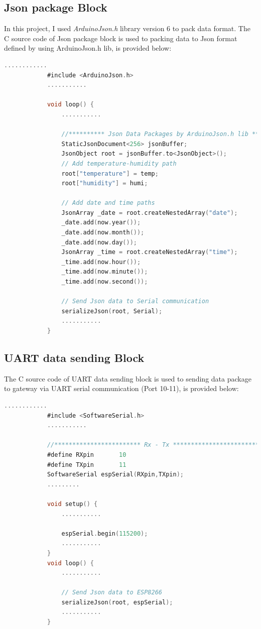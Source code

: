 \documentclass[13pt,a4paper]{article}
\begin{document}
		\subsection{Json package Block}
		In this project, I used \textit{ArduinoJson.h} library version 6 to pack data format.
		The C source code of Json package block is used to packing data to Json format defined by using ArduinoJson.h lib, is provided below:
		\begin{lstlisting}[language=C, caption= Packing data to Json Type, label=test_float]
			............
			#include <ArduinoJson.h>
			...........
			
			void loop() {
				...........
				
				//********** Json Data Packages by ArduinoJson.h lib ****************
				StaticJsonDocument<256> jsonBuffer;
				JsonObject root = jsonBuffer.to<JsonObject>();
				// Add temperature-humidity path
				root["temperature"] = temp;
				root["humidity"] = humi;
				
				// Add date and time paths
				JsonArray _date = root.createNestedArray("date");
				_date.add(now.year());
				_date.add(now.month());
				_date.add(now.day());
				JsonArray _time = root.createNestedArray("time");
				_time.add(now.hour());
				_time.add(now.minute());
				_time.add(now.second());
				
				// Send Json data to Serial communication
				serializeJson(root, Serial);
				...........
			}
		\end{lstlisting}
	
		\subsection{UART data sending Block}
		The C source code of UART data sending block is used to sending data package to gateway via UART serial communication (Port 10-11), is provided below:
		\begin{lstlisting}[language=C, caption= Sending data package to gateway, label=test_float]
			............
			#include <SoftwareSerial.h>
			...........
			
			//************************ Rx - Tx ************************************
			#define RXpin       10
			#define TXpin       11
			SoftwareSerial espSerial(RXpin,TXpin);
			.........
			
			void setup() {
				...........
				
				espSerial.begin(115200);
				...........
			}
			void loop() {
				...........
				
				// Send Json data to ESP8266
				serializeJson(root, espSerial);
				...........
			}
		\end{lstlisting}
	
\end{document}
